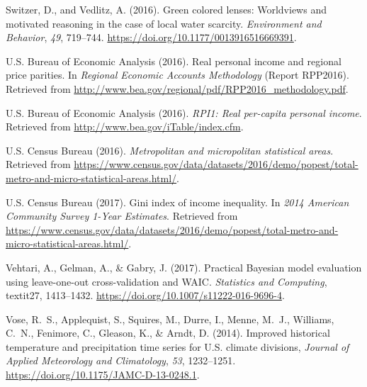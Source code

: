 \documentclass[draft,linenumbers]{agujournal}\usepackage{knitr}
\begin{document}
\begin{thebibliography}{33}
  Switzer, D., and Vedlitz, A. (2016).
  Green colored lenses: Worldviews and motivated reasoning in the case of local
  water scarcity.
  \textit{Environment and Behavior}, \textit{49}, 719--744.
  \url{https://doi.org/10.1177/0013916516669391}.

  U.S. Bureau of Economic Analysis (2016{}).
  Real personal income and regional price parities.
  In \textit{Regional Economic Accounts Methodology\/}
  (Report  RPP2016).
  Retrieved from
  \url{http://www.bea.gov/regional/pdf/RPP2016_methodology.pdf}.

  U.S. Bureau of Economic Analysis (2016{}).
  \textit{{RPI1}: Real per-capita personal income}.
  Retrieved from
  \url{http://www.bea.gov/iTable/index.cfm}.

  U.S. Census Bureau (2016).
  \textit{Metropolitan and micropolitan statistical areas}.
  Retrieved from
  \url{https://www.census.gov/data/datasets/2016/demo/popest/total-metro-and-micro-statistical-areas.html/}.

  {U.S. Census Bureau} (2017).
  Gini index of income inequality.
  In \textit{2014 American Community Survey 1-Year Estimates}.
  Retrieved from
  \url{https://www.census.gov/data/datasets/2016/demo/popest/total-metro-and-micro-statistical-areas.html/}.

  Vehtari, A., Gelman, A., \& Gabry, J. (2017).
  Practical {Bayesian} model evaluation using leave-one-out cross-validation and {WAIC}.
  \textit{Statistics and Computing}, textit{27}, 1413--1432.
  \url{https://doi.org/10.1007/s11222-016-9696-4}.

  Vose, R.~S., Applequist, S., Squires, M., Durre, I., Menne, M.~J., Williams, C.~N.,
  Fenimore, C., Gleason, K., \& Arndt, D. (2014).
  Improved historical temperature and precipitation time series for {U}.{S}.
  climate divisions,
  \textit{Journal of  Applied Meteorology and Climatology}, \textit{53}, 1232--1251.
  \url{https://doi.org/10.1175/JAMC-D-13-0248.1}.


\end{thebibliography}
\end{document}

